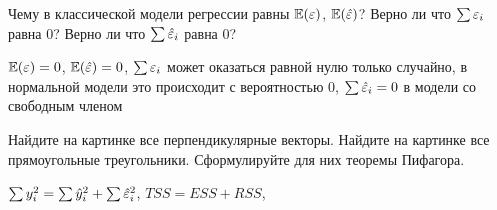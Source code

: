 \begin{problem}
Чему в классической модели регрессии равны $\mathbb{E}(\varepsilon)$, $\mathbb{E}(\hat{\varepsilon})$? Верно ли что $\sum \varepsilon_i$ равна 0? Верно ли что $\sum \hat{\varepsilon}_i$ равна 0?

\begin{sol}
$\mathbb{E}(\varepsilon)=0$, $\mathbb{E}(\hat{\varepsilon})=0$, $\sum \varepsilon_i$ может оказаться равной нулю только случайно, в нормальной модели это происходит с вероятностью 0, $\sum \hat{\varepsilon}_i=0$ в модели со свободным членом
\end{sol}
\end{problem}



\begin{problem}
Найдите на картинке все перпендикулярные векторы. Найдите на картинке все прямоугольные треугольники. Сформулируйте для них теоремы Пифагора.






\begin{sol}
$\sum y_i^2=\sum \hat{y}_i^2+\sum \hat{\varepsilon}_i^2$, $TSS=ESS+RSS$,
\end{sol}
\end{problem}



